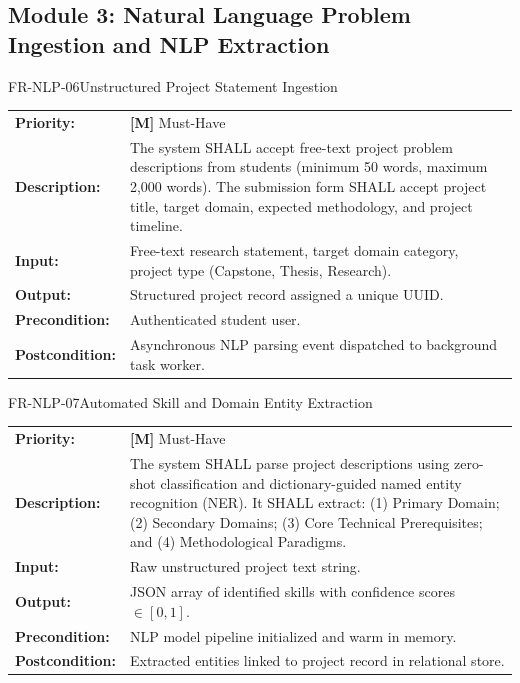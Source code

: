 \documentclass[11pt,a4paper]{article}
\begin{document}
\subsection{Module 3: Natural Language Problem Ingestion and NLP Extraction}

\begin{reqbox}{FR-NLP-06}{Unstructured Project Statement Ingestion}
\begin{tabularx}{\textwidth}{@{}lX@{}}
\textbf{Priority:} & \textbf{[M]} Must-Have \\
\textbf{Description:} & The system SHALL accept free-text project problem descriptions from students (minimum 50 words, maximum 2,000 words). The submission form SHALL accept project title, target domain, expected methodology, and project timeline. \\
\textbf{Input:} & Free-text research statement, target domain category, project type (Capstone, Thesis, Research). \\
\textbf{Output:} & Structured project record assigned a unique UUID. \\
\textbf{Precondition:} & Authenticated student user. \\
\textbf{Postcondition:} & Asynchronous NLP parsing event dispatched to background task worker. \\
\end{tabularx}
\end{reqbox}

\begin{reqbox}{FR-NLP-07}{Automated Skill and Domain Entity Extraction}
\begin{tabularx}{\textwidth}{@{}lX@{}}
\textbf{Priority:} & \textbf{[M]} Must-Have \\
\textbf{Description:} & The system SHALL parse project descriptions using zero-shot classification and dictionary-guided named entity recognition (NER). It SHALL extract: (1) Primary Domain; (2) Secondary Domains; (3) Core Technical Prerequisites; and (4) Methodological Paradigms. \\
\textbf{Input:} & Raw unstructured project text string. \\
\textbf{Output:} & JSON array of identified skills with confidence scores $\in [0, 1]$. \\
\textbf{Precondition:} & NLP model pipeline initialized and warm in memory. \\
\textbf{Postcondition:} & Extracted entities linked to project record in relational store. \\
\end{tabularx}
\end{reqbox}
\end{document}
